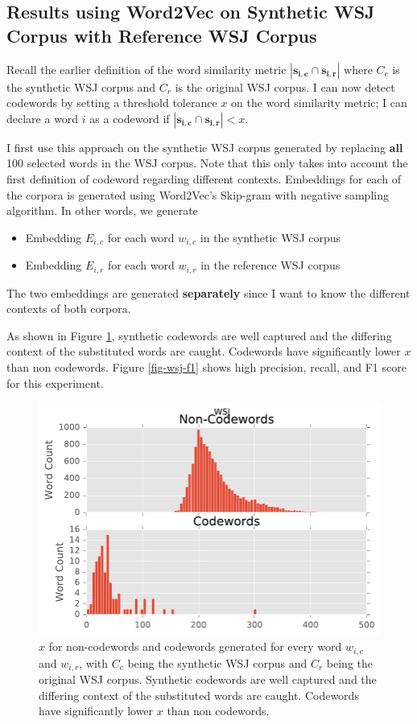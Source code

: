 \subsection{Results using Word2Vec on Synthetic WSJ Corpus with Reference WSJ Corpus}

Recall the earlier definition of the word similarity metric $|\mathbf{s_{i ,c}} \cap \mathbf{s_{i ,r}}|$ where $C_c$ is the synthetic WSJ corpus and $C_r$ is the original WSJ corpus. I can now detect codewords by setting a threshold tolerance $x$ on the word similarity metric; I can declare a word $i$ as a codeword if $|\mathbf{s_{i ,c}} \cap \mathbf{s_{i ,r}}| < x$.

I first use this approach on the synthetic WSJ corpus generated by replacing \textbf{all} 100 selected words in the WSJ corpus. Note that this only takes into account the first definition of codeword regarding different contexts. Embeddings for each of the corpora is generated using Word2Vec's Skip-gram with negative sampling algorithm. In other words, we generate

\begin{itemize}
\item Embedding $E_{i, c}$ for each word $w_{i, c}$ in the synthetic WSJ corpus
\item Embedding $E_{i, r}$ for each word $w_{i, r}$ in the reference WSJ corpus
\end{itemize}

The two embeddings are generated \textbf{separately} since I want to know the different contexts of both corpora.

As shown in Figure \ref{fig-wsj-count}, synthetic codewords are well captured and the differing context of the substituted words are caught. Codewords have significantly lower $x$ than non codewords. Figure \ref{fig-wsj-f1} shows high precision, recall, and F1 score for this experiment.

\begin{figure}[h]
\centering
\includegraphics[width=.5\textwidth]{figures/wsj-count.pdf}
\caption{$x$ for non-codewords and codewords generated for every word $w_{i, c}$ and $w_{i, r}$, with $C_c$ being the synthetic WSJ corpus and $C_r$ being the original WSJ corpus. Synthetic codewords are well captured and the differing context of the substituted words are caught. Codewords have significantly lower $x$ than non codewords.}
\label{fig-wsj-count}
\end{figure}

